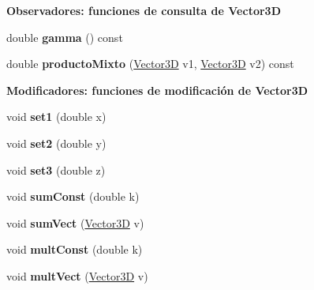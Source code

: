 \begin{Indent}{\bf Observadores\+: funciones de consulta de Vector3D}
\begin{DoxyCompactItemize}
\item 
double {\bfseries gamma} () const \hypertarget{classed_1_1Vector3D_a80862b81883ec306410333f3f5c93d83}{}\label{classed_1_1Vector3D_a80862b81883ec306410333f3f5c93d83}

\item 
double {\bfseries producto\+Mixto} (\hyperlink{classed_1_1Vector3D}{Vector3D} v1, \hyperlink{classed_1_1Vector3D}{Vector3D} v2) const \hypertarget{classed_1_1Vector3D_a4799486de04e8fbf376bd8e89a2219a7}{}\label{classed_1_1Vector3D_a4799486de04e8fbf376bd8e89a2219a7}

\end{DoxyCompactItemize}
\end{Indent}
\begin{Indent}{\bf Modificadores\+: funciones de modificación de Vector3D}\par
\begin{DoxyCompactItemize}
\item 
void {\bfseries set1} (double x)\hypertarget{classed_1_1Vector3D_a09b5b2f452f7ddfdf77182bc22bcd7e4}{}\label{classed_1_1Vector3D_a09b5b2f452f7ddfdf77182bc22bcd7e4}

\item 
void {\bfseries set2} (double y)\hypertarget{classed_1_1Vector3D_ac40c05aec63ffbd08aea17e10301f168}{}\label{classed_1_1Vector3D_ac40c05aec63ffbd08aea17e10301f168}

\item 
void {\bfseries set3} (double z)\hypertarget{classed_1_1Vector3D_a454a235146c579f6e49073bc71d504c1}{}\label{classed_1_1Vector3D_a454a235146c579f6e49073bc71d504c1}

\item 
void {\bfseries sum\+Const} (double k)\hypertarget{classed_1_1Vector3D_a3536267a5fe8f2a9d18b6fc158c9b0fd}{}\label{classed_1_1Vector3D_a3536267a5fe8f2a9d18b6fc158c9b0fd}

\item 
void {\bfseries sum\+Vect} (\hyperlink{classed_1_1Vector3D}{Vector3D} v)\hypertarget{classed_1_1Vector3D_a6c31fdc9d7c09481b51626a424bac047}{}\label{classed_1_1Vector3D_a6c31fdc9d7c09481b51626a424bac047}

\item 
void {\bfseries mult\+Const} (double k)\hypertarget{classed_1_1Vector3D_a1f82fa0f3dce2b74207419097f826827}{}\label{classed_1_1Vector3D_a1f82fa0f3dce2b74207419097f826827}

\item 
void {\bfseries mult\+Vect} (\hyperlink{classed_1_1Vector3D}{Vector3D} v)\hypertarget{classed_1_1Vector3D_a9952e96f739a4a4f1a9a1c626a3f5ead}{}\label{classed_1_1Vector3D_a9952e96f739a4a4f1a9a1c626a3f5ead}

\end{DoxyCompactItemize}
\end{Indent}
